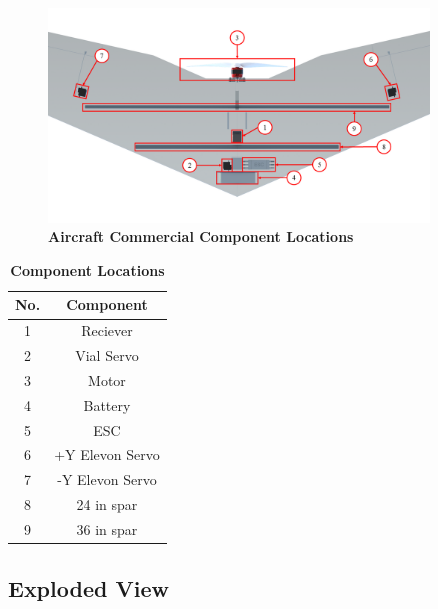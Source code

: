        \begin{figure}[H]
            \centering
            \includegraphics[width=0.9\textwidth]{homeworks/homework4/report/Figure/aircraft_assembly_underbelly_labeled.png}
            \caption{\textbf{Aircraft Commercial Component Locations}}
            \label{fig:component_locations}
        \end{figure}
        
        \begin{table}[H]
        \begin{center}
        \caption{\textbf{Component Locations}} \label{tab:component_locations}
        \begin{tabular}{|c|c|} 
            \hline
            \textbf{No.} & \textbf{Component} \\ \hline
            1 & Reciever \\ \hline
            2 & Vial Servo \\ \hline
            3 & Motor \\ \hline
            4 & Battery \\ \hline
            5 & ESC \\ \hline
            6 & +Y Elevon Servo \\ \hline
            7 & -Y Elevon Servo \\ \hline
            8 & 24 in spar \\ \hline
            9 & 36 in spar \\ \hline
        \end{tabular}
        \end{center}
        \end{table}
        
    \subsection{Exploded View}
    
